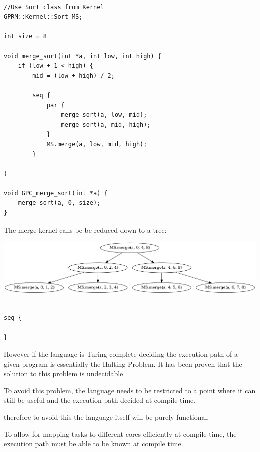 \begin{lstlisting}[style=myGPC]

//Use Sort class from Kernel
GPRM::Kernel::Sort MS;

int size = 8

void merge_sort(int *a, int low, int high) {
    if (low + 1 < high) {
        mid = (low + high) / 2;
   
        seq {
            par {
                merge_sort(a, low, mid);
                merge_sort(a, mid, high);
            }
            MS.merge(a, low, mid, high);            
        }
    
)

void GPC_merge_sort(int *a) {
    merge_sort(a, 0, size);
}

\end{lstlisting}

The merge kernel calls be be reduced down to a tree:

\begin{center}
\includegraphics[scale=0.4]{graphs/mergesortTree.png}
\end{center}


\begin{lstlisting}[style=myGPC]

seq {

}

\end{lstlisting}

However if the language is Turing-complete deciding the execution path
of a given program is essentially the Halting Problem. It has been proven that the solution to this problem is undecidable\cite{halting} 

To avoid this problem, the language needs to be restricted to a point where it can still be useful and the execution
path decided at compile time.



   therefore
to avoid this the language itself will be purely functional.
        
        To allow for mapping tasks to different cores efficiently
        at compile time, the execution path must be able
        to be known at compile time. 
        

